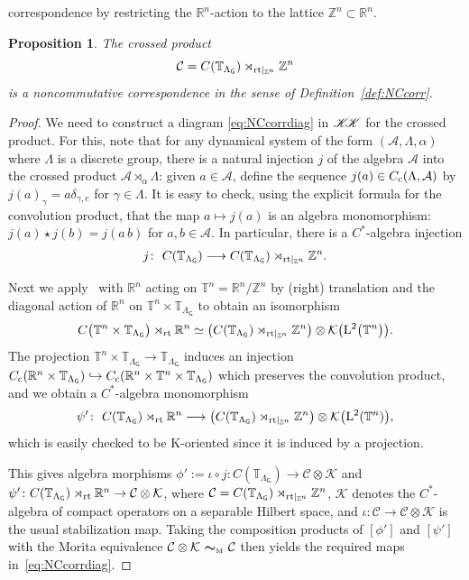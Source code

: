 \documentclass[10pt,a4paper]{amsart}
\numberwithin{equation}{section}
\newcommand{\Z}{\zed}
\newcommand{\mbf}[1]{{\boldsymbol {#1} }}
\newcommand{\CCK}{\mathscr{K}}
\newcommand{\CK}{\mathcal{K}}
\newcommand{\Ccal}{\mathcal{C}}
\newcommand{\sfG}{\mathsf{G}}
\newcommand{\Leb}{{\rm L}}
\newcommand{\rt}{{\rm rt}}
\newcommand{\zed}{{\mathbb Z}} %
\newcommand{\real}{{\mathbb R}} %
\newcommand{\torus}{{\mathbb T}} %
\def\alg{{\mathcal A}}
\newtheorem{Proposition}[Theorem]{Proposition}
 { \theoremstyle{definition}
\newtheorem{Definition}[Theorem]{Definition}
\newtheorem{Note}[Theorem]{Note}
\newtheorem{Example}[Theorem]{Example}
\newtheorem{Remark}[Theorem]{Remark} }
\begin{document}
correspondence by restricting the $\real^n$-action to the lattice
$\zed^n\subset\real^n$.
\begin{Proposition}\label{prop:NCcorr}
The crossed product
\[
\Ccal=C(\torus_{\Lambda_\sfG})\rtimes_{\rt|_{\zed^n}} \zed^n
\]
is a {noncommutative correspondence} in the sense of
Definition~\ref{def:NCcorr}.
\end{Proposition}
\begin{proof}
We need to construct a diagram \eqref{eq:NCcorrdiag} in $\CCK\hspace{-1mm}\CCK$ for the
crossed product. For this,
note that for any dynamical system of the form $(\alg,\Lambda,\alpha)$
where $\Lambda$ is a discrete group, there is a
natural injection $j$ of the algebra $\alg$ into the crossed product
$\alg\rtimes_\alpha\Lambda$: given $a\in\alg$, define the sequence
$j(a)\in C_{\rm c}(\Lambda,\alg)$ by $j(a)_{\gamma}=a \delta_{\gamma,e}$ for $\gamma\in\Lambda$. It is
easy to check, using the explicit formula for the convolution product,
that the map $a\mapsto j(a)$ is an algebra
monomorphism:
$j(a)\star j(b)=j(a\,b)$ for $a,b\in\alg$. In particular,
there is a $C^*$-algebra injection
\begin{gather}\label{eq:jmono}
j\colon \ C(\torus_{\Lambda_\sfG})\longrightarrow
C(\torus_{\Lambda_\sfG})\rtimes_{\rt|_{\zed^n}} \zed^n .
\end{gather}

Next we apply~\cite[Corollary~2.8]{Green1980} with $\real^n$ acting on
$\torus^n=\real^n/\Z^n$ by (right) translation and the diagonal action of
$\real^n$ on $\torus^n\times\torus_{\Lambda_\sfG}$ to obtain an
isomorphism
\[
C\big(\torus^n\times\torus_{\Lambda_\sfG}\big)\rtimes_\rt\real^n \simeq
\big(C(\torus_{\Lambda_\sfG})\rtimes_{\rt|_{\Z^n}}\Z^n\big) \otimes
\CK\big(\Leb^2\big(\torus^n\big)\big) .
\]
The projection
$\torus^n\times\torus_{\Lambda_\sfG}\to\torus_{\Lambda_\sfG}$ induces an injection
$C_{\rm c}(\real^n\times\torus_{\Lambda_\sfG})\hookrightarrow
C_{\rm c}(\real^n\times\torus^n\times\torus_{\Lambda_{\sfG}})$ which preserves the
convolution product, and we obtain a $C^*$-algebra monomorphism
\[
\psi'\colon \ C(\torus_{\Lambda_\sfG})\rtimes_\rt\real^n\longrightarrow
\big(C(\torus_{\Lambda_\sfG})\rtimes_{\rt|_{\Z^n}}\Z^n\big) \otimes
\CK\big(\Leb^2(\torus^n)\big) ,
\]
which is easily checked to be K-oriented since it is induced by a
projection.

This gives algebra morphisms $\phi':=\iota\circ
j\colon C(\torus_{\Lambda_\sfG})\to\Ccal\otimes\CK$ and
$\psi'\colon C(\torus_{\Lambda_\sfG})\rtimes_\rt\real^n\to\Ccal\otimes\CK$,
where $\Ccal=C(\torus_{\Lambda_\sfG})\rtimes_{\rt|_{\zed^n}} \zed^n$, $\CK$ denotes the
$C^*$-algebra of compact operators on a
separable Hilbert space,
and $\iota\colon \Ccal\to\Ccal\otimes\CK$ is the usual stabilization map. Taking the composition products of $[\phi']$ and $[\psi']$ with the
Morita equivalence $\Ccal\otimes\CK \ \mbf\sim_{\text{\tiny M}} \
\Ccal$ then yields the required maps in~\eqref{eq:NCcorrdiag}.
\end{proof}
\end{document}
